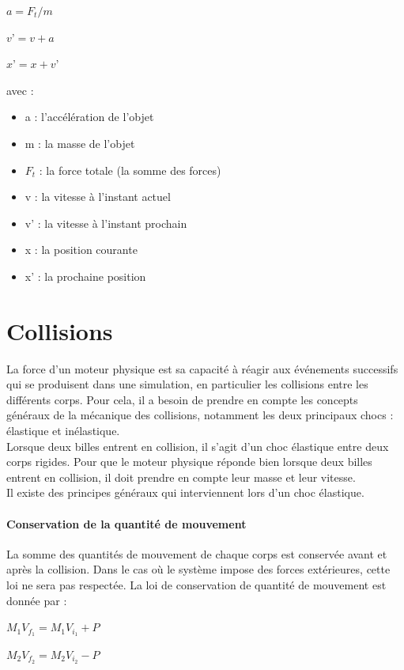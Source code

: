 \documentclass{report}
\begin{document}
\(a = F_t / m\)

\(v’ = v + a\)

\(x’ = x + v’\)

avec :
\begin{itemize}
\item a : l'accélération de l'objet
\item m : la masse de l’objet
\item \(F_t\) : la force totale (la somme des forces)
\item v : la vitesse à l’instant actuel
\item v’ : la vitesse à l’instant prochain
\item x : la position courante
\item x' : la prochaine position
\end{itemize}

\section{Collisions}

La force d’un moteur physique est sa capacité à réagir aux événements successifs qui se produisent dans une simulation, en particulier les collisions entre les différents corps. Pour cela, il a besoin de prendre en compte les concepts généraux de la mécanique des collisions, notamment les deux principaux chocs : élastique et inélastique. \\

Lorsque deux billes entrent en collision, il s’agit d’un choc élastique entre deux corps rigides. Pour que le moteur physique réponde bien lorsque deux billes entrent en collision, il doit prendre en compte leur masse et leur vitesse. \\

Il existe des principes généraux \cite{02} qui interviennent lors d’un choc élastique.

\paragraph*{Conservation de la quantité de mouvement}

La somme des quantités de mouvement de chaque corps est conservée avant et après la collision. Dans le cas où le système impose des forces extérieures, cette loi ne sera pas respectée.
La loi de conservation de quantité de mouvement est donnée par :

\(M_1V_{f_1} = M_1V_{i_1} + P\)

\(M_2V_{f_2} = M_2V_{i_2} - P\)
\end{document}
